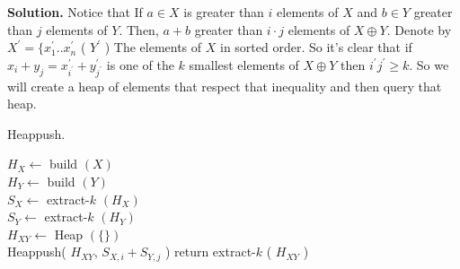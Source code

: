 \textbf{Solution.} Notice that If $a \in X$ is greater than $i$ elements of $X$ and $b \in Y$ greater than $j$ elements of $Y$. Then, $a + b$  greater than $i\cdot j$ elements of $X \oplus Y$. Denote by $X^\prime = \{ x^{\prime}_{1} .. x^{\prime}_{n}$ ( $Y^{\prime}$ ) The elements of $X$ in sorted order. So it's clear that if $x_{i}+y_{j} = x^{\prime}_{i^{\prime}} + y^{\prime}_{j^{\prime}}$ is one of the $k$ smallest elements of $X\oplus Y$ then $i^{\prime}j^{\prime} \ge k$. So we will create a heap of elements that respect that inequality and then query that heap.

\begin{algbox}{Heappush.}
\begin{algorithm}[H]
$ H_{X} \leftarrow $ build $\left( X \right)$  \\ 
$ H_{Y} \leftarrow $ build $\left( Y \right)$  \\
$ S_{X} \leftarrow $ extract-$k$ $\left( H_{X} \right)$  \\ 
$ S_{Y} \leftarrow $ extract-$k$ $\left( H_{Y} \right)$  \\
$ H_{XY} \leftarrow $ Heap $(\{ \} )$ \\
 {
   {
  	Heappush( $H_{XY}$, $S_{X,i} + S_{Y, j}$ )    
  }
}
return extract-$k$ ( $H_{XY}$ ) 
\end{algorithm}
\end{algbox}
\fi



